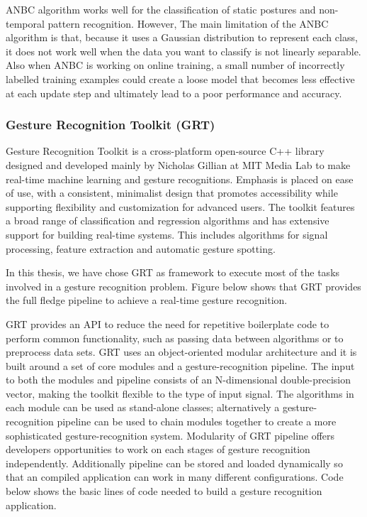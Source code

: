 ANBC algorithm works well for the classification of static postures and non-temporal pattern recognition. However, The main limitation of the ANBC algorithm is that, because it uses a Gaussian distribution to represent each class, it does not work well when the data you want to classify is not linearly separable. Also when ANBC is working on online training, a small number of incorrectly labelled training examples could create a loose model that becomes less effective at each update step and ultimately lead to a poor performance and accuracy.


\subsubsection{Gesture Recognition Toolkit (GRT)}
Gesture Recognition Toolkit is a cross-platform open-source C++ library designed and developed mainly by Nicholas Gillian at MIT Media Lab to make real-time machine learning and gesture recognitions. Emphasis is placed on ease of use, with a consistent, minimalist design that promotes accessibility while supporting flexibility and customization for advanced users. The toolkit features a broad range of classification and regression algorithms and has extensive support for building real-time systems. This includes algorithms for signal processing, feature extraction and automatic gesture spotting. 

In this thesis, we have chose GRT as framework to execute most of the tasks involved in a gesture recognition problem. Figure below shows that GRT provides the full fledge pipeline to achieve a real-time gesture recognition. 

GRT provides an API to reduce the need for repetitive boilerplate code to perform common functionality, such as passing data between algorithms or to preprocess data sets. GRT uses an object-oriented modular architecture and it is built around a set of core modules and a gesture-recognition pipeline. The input to both the modules and pipeline consists of an N-dimensional double-precision vector, making the toolkit flexible to the type of input signal. The algorithms in each module can be used as stand-alone classes; alternatively a gesture-recognition pipeline can be used to chain modules together to create a more sophisticated gesture-recognition system. Modularity of GRT pipeline offers developers opportunities to work on each stages of gesture recognition independently. Additionally pipeline can be stored and loaded dynamically so that an compiled application can work in many different configurations. Code below shows the basic lines of code needed to build a gesture recognition application.

